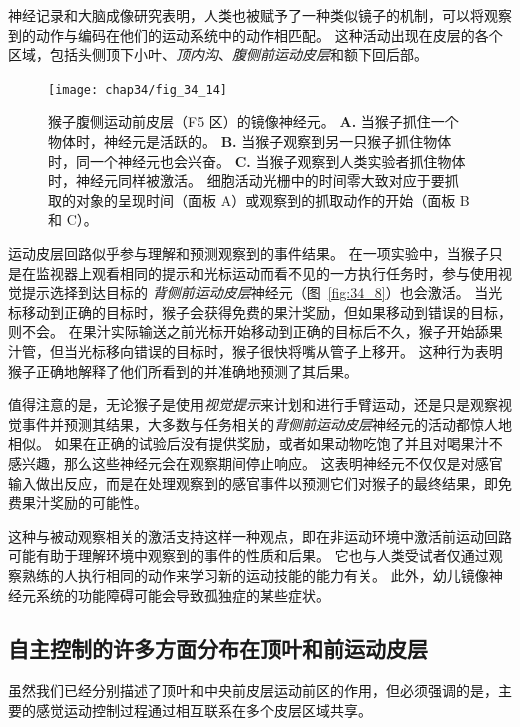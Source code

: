 神经记录和大脑成像研究表明，人类也被赋予了一种类似镜子的机制，可以将观察到的动作与编码在他们的运动系统中的动作相匹配。
这种活动出现在皮层的各个区域，包括头侧顶下小叶、\textit{顶内沟}、\textit{腹侧前运动皮层}和额下回后部。


\begin{figure}[htbp]
	\centering
	\texttt{[image: chap34/fig\_34\_14]}
	\caption{猴子腹侧运动前皮层（F5 区）的镜像神经元\cite{rizzolatti1996premotor}。
		\textbf{A.} 当猴子抓住一个物体时，神经元是活跃的。
		\textbf{B.} 当猴子观察到另一只猴子抓住物体时，同一个神经元也会兴奋。
		\textbf{C.} 当猴子观察到人类实验者抓住物体时，神经元同样被激活。
		细胞活动光栅中的时间零大致对应于要抓取的对象的呈现时间（面板 A）或观察到的抓取动作的开始（面板 B 和 C）。}
	\label{fig:34_14}
\end{figure}


运动皮层回路似乎参与理解和预测观察到的事件结果。
在一项实验中，当猴子只是在监视器上观看相同的提示和光标运动而看不见的一方执行任务时，参与使用视觉提示选择到达目标的 \textit{背侧前运动皮层}神经元（图~\ref{fig:34_8}）也会激活。
当光标移动到正确的目标时，猴子会获得免费的果汁奖励，但如果移动到错误的目标，则不会。
在果汁实际输送之前光标开始移动到正确的目标后不久，猴子开始舔果汁管，但当光标移向错误的目标时，猴子很快将嘴从管子上移开。
这种行为表明猴子正确地解释了他们所看到的并准确地预测了其后果。


值得注意的是，无论猴子是使用\textit{视觉提示}来计划和进行手臂运动，还是只是观察视觉事件并预测其结果，大多数与任务相关的\textit{背侧前运动皮层}神经元的活动都惊人地相似。
如果在正确的试验后没有提供奖励，或者如果动物吃饱了并且对喝果汁不感兴趣，那么这些神经元会在观察期间停止响应。
这表明神经元不仅仅是对感官输入做出反应，而是在处理观察到的感官事件以预测它们对猴子的最终结果，即免费果汁奖励的可能性。


这种与被动观察相关的激活支持这样一种观点，即在非运动环境中激活前运动回路可能有助于理解环境中观察到的事件的性质和后果。
它也与人类受试者仅通过观察熟练的人执行相同的动作来学习新的运动技能的能力有关。
此外，幼儿镜像神经元系统的功能障碍可能会导致孤独症的某些症状。



\subsection{自主控制的许多方面分布在顶叶和前运动皮层}

虽然我们已经分别描述了顶叶和中央前皮层运动前区的作用，但必须强调的是，主要的感觉运动控制过程通过相互联系在多个皮层区域共享。


